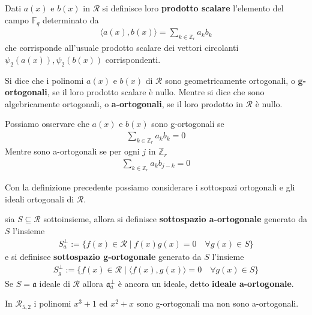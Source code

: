 \begin{definizione}
   Dati $a(x)$ e $b(x)$ in $\mathcal{R}$ si definisce loro {\bf prodotto scalare} l'elemento del campo $\mathbb{F}_{q}$ determinato da 
   \begin{align*}
      \langle a(x), b(x) \rangle = \sum_{k \in \mathbb{Z}_{r} } a_{k}b_{k}
   \end{align*}   
   che corrisponde all'usuale prodotto scalare dei vettori circolanti  $\psi_{2}(a(x)), \psi_{2}(b(x))$ corrispondenti.
\end{definizione}
\begin{definizione}
   Si dice che i polinomi $a(x)$ e $b(x)$ di $\mathcal{R}$ sono geometricamente ortogonali, o {\bf g-ortogonali}, se il loro prodotto scalare è nullo.
   Mentre si dice che sono algebricamente ortogonali, o {\bf a-ortogonali}, se il loro prodotto in $\mathcal{R}$ è nullo.
\end{definizione}
\begin{osservazione} \label{oss:aOrtogonali}
   Possiamo osservare che $a(x)$ e $b(x)$ sono g-ortogonali se
   \begin{align*}
      \sum_{k \in \mathbb{Z}_{r} } a_{k}b_{k} = 0
   \end{align*} 
   Mentre sono a-ortogonali se per ogni $j$ in $\mathbb{Z}_{r}$
   \begin{align*}
      \sum_{k \in \mathbb{Z}_{r}} a_{k}b_{j-k} = 0 
   \end{align*} 
\end{osservazione}

Con la definizione precedente possiamo considerare i sottospazi ortogonali e gli ideali ortogonali di $\mathcal{R}$.
\begin{definizione}
   sia $S\subseteq \mathcal{R}$ sottoinsieme, allora si definisce {\bf sottospazio a-ortogonale} generato da $S$ l'insieme
   \begin{align*}
      S_{a}^{\perp} := \lbrace f(x) \in \mathcal{R} \mid f(x)g(x) = 0 \quad \forall g(x) \in S \rbrace
   \end{align*}
   e si definisce {\bf sottospazio g-ortogonale} generato da $S$ l'insieme
   \begin{align*}
      S_{g}^{\perp} := \lbrace f(x) \in \mathcal{R} \mid \langle f(x), g(x)\rangle = 0 \quad \forall g(x) \in S \rbrace
   \end{align*}
   Se $S = \mathfrak{a}$ ideale di $\mathcal{R}$ allora $\mathfrak{a}_{a}^{\perp}$ è ancora un ideale, detto {\bf ideale a-ortogonale}.
\end{definizione}
\begin{esempio} \label{ese:ortogonali1}
   In  $\mathcal{R}_{5,2}$ i polinomi $x^3 + 1$ ed $x^2+x$ sono g-ortogonali ma non sono a-ortogonali. 
\end{esempio}

